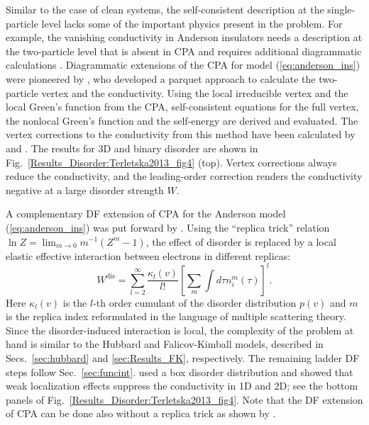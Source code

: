 \documentclass[rmp,aps,reprint,amsmath,amssymb,superscriptaddress,showpacs,nofootinbib]{revtex4-1}
\begin{document}
Similar to the case of clean systems, the self-consistent description at the single-particle level lacks some of the important physics present in the problem. For example, the vanishing conductivity in Anderson insulators needs a description at the two-particle level that is absent in CPA \cite{Jarrell2001a} and requires additional diagrammatic calculations \cite{Kroha1990,Janis2005}. Diagrammatic extensions of the CPA for model (\ref{eq:anderson_ins}) were pioneered by , who developed a parquet approach to calculate the two-particle vertex and the conductivity. Using the local irreducible vertex and the local Green's function from the CPA, self-consistent equations for the full vertex, the nonlocal Green's function and the self-energy are derived  and evaluated. The vertex corrections to the conductivity from this method have been calculated by  and . The results for 3D and binary disorder are shown in Fig.\ \ref{Results_Disorder:Terletska2013_fig4} (top). Vertex corrections always reduce the conductivity, and the leading-order correction renders the conductivity negative at a large disorder strength $W$. 

A complementary DF extension of CPA for the Anderson model (\ref{eq:anderson_ins}) was put forward by . Using the ``replica trick'' relation $\ln Z = \lim_{m\to 0} m^{-1}(Z^m - 1)$, the effect of disorder is replaced by a local elastic effective interaction between electrons in different replicas:  
\begin{equation}
  W^{\mathrm{dis}} = \sum_{l=2}^\infty \frac{\kappa_l (v)}{l!} \left[\sum_m \int d\tau n_i^m(\tau)\right]^l.
\end{equation} 
Here $\kappa_l (v)$ is the $l$-th order cumulant of the disorder distribution $p(v)$ and $m$ is the replica index reformulated in the language of multiple scattering theory. Since the disorder-induced interaction is local, the complexity of the problem at hand is similar to the Hubbard and Falicov-Kimball models, described in Secs.~\ref{sec:hubbard} and  \ref{sec:Results_FK}, respectively. The remaining ladder DF steps follow Sec.~\ref{sec:funcint}.  used a box disorder distribution and showed that  weak localization effects suppress the conductivity in 1D and 2D; see the bottom panels of Fig.~\ref{Results_Disorder:Terletska2013_fig4}. Note that the DF extension of CPA can be done also without a replica trick as shown by .
\end{document}

